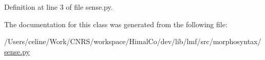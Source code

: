 Definition at line 3 of file sense.\+py.



The documentation for this class was generated from the following file\+:\begin{DoxyCompactItemize}
\item 
/\+Users/celine/\+Work/\+C\+N\+R\+S/workspace/\+Himal\+Co/dev/lib/lmf/src/morphosyntax/\hyperlink{morphosyntax_2sense_8py}{sense.\+py}\end{DoxyCompactItemize}
